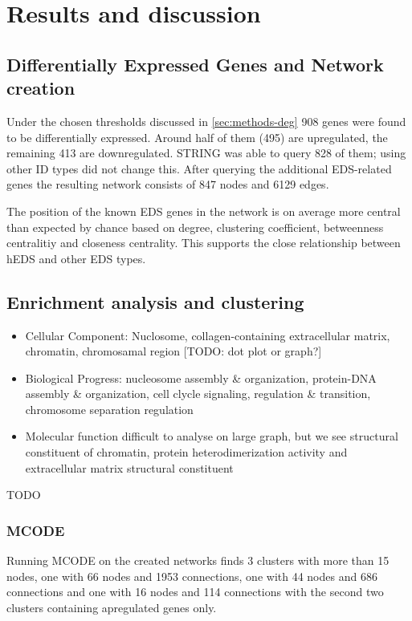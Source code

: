 \section{Results and discussion}
\subsection{Differentially Expressed Genes and Network creation}

Under the chosen thresholds discussed in \ref{sec:methods-deg} 908 genes were found to be differentially expressed. Around half of them (495) are upregulated, the remaining 413 are downregulated. STRING was able to query 828 of them; using other ID types did not change this. After querying the additional EDS-related genes the resulting network consists of 847 nodes and 6129 edges.

The position of the known EDS genes in the network is on average more central than expected by chance based on degree, clustering coefficient, betweenness centralitiy and closeness centrality. This supports the close relationship between hEDS and other EDS types.

\subsection{Enrichment analysis and clustering}

\begin{itemize}
	\item Cellular Component: Nuclosome, collagen-containing extracellular matrix, chromatin, chromosamal region [TODO: dot plot or graph?]
	\item Biological Progress: nucleosome assembly \& organization, protein-DNA assembly \& organization, cell clycle signaling, regulation \& transition, chromosome separation regulation
	\item Molecular function difficult to analyse on large graph, but we see structural constituent of chromatin, protein heterodimerization activity and extracellular matrix structural constituent
\end{itemize}


TODO

\subsubsection{MCODE}
Running MCODE on the created networks finds 3 clusters with more than 15 nodes, one with 66 nodes and 1953 connections, one with 44 nodes and 686 connections and one with 16 nodes and 114 connections with the second two clusters containing apregulated genes only.

